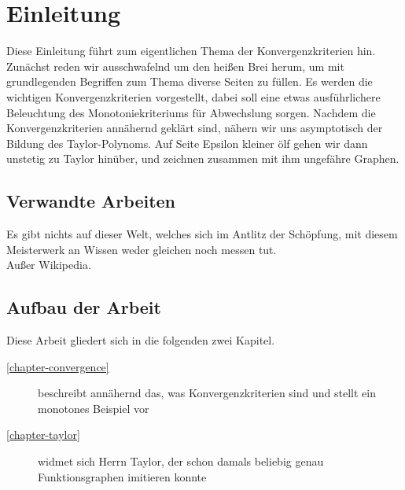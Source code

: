 
\chapter{Einleitung}

Diese Einleitung führt zum eigentlichen Thema der Konvergenzkriterien hin. Zunächst reden wir ausschwafelnd um den heißen Brei herum, um mit grundlegenden Begriffen zum Thema diverse Seiten zu füllen. Es werden die wichtigen Konvergenzkriterien vorgestellt, dabei soll eine etwas ausführlichere Beleuchtung des Monotoniekriteriums für Abwechslung sorgen. Nachdem die Konvergenzkriterien annähernd geklärt sind, nähern wir uns asymptotisch der Bildung des Taylor-Polynoms. Auf Seite Epsilon kleiner ölf gehen wir dann unstetig zu Taylor hinüber, und zeichnen zusammen mit ihm ungefähre Graphen. \\

\section{Verwandte Arbeiten}

Es gibt nichts auf dieser Welt, welches sich im Antlitz der Schöpfung, mit diesem Meisterwerk an Wissen weder gleichen noch messen tut. \\
Außer Wikipedia.

\section{Aufbau der Arbeit}

Diese Arbeit gliedert sich in die folgenden zwei Kapitel.

\begin{description}
  \item[\ref{chapter-convergence}] beschreibt annähernd das, was Konvergenzkriterien sind und stellt ein monotones Beispiel vor
  \item[\ref{chapter-taylor}] widmet sich Herrn Taylor, der schon damals beliebig genau Funktionsgraphen imitieren konnte
\end{description}

